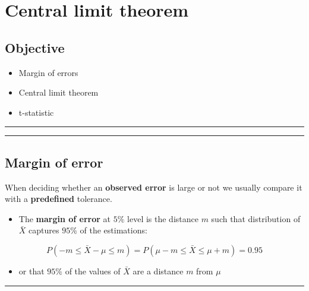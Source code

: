 \documentclass[
]{book}
\providecommand{\tightlist}{%
  \setlength{\itemsep}{0pt}\setlength{\parskip}{0pt}}
\begin{document}
\hypertarget{central-limit-theorem}{%
\chapter{Central limit theorem}\label{central-limit-theorem}}

\hypertarget{objective-9}{%
\section{Objective}\label{objective-9}}

\begin{itemize}
\tightlist
\item
  Margin of errors
\item
  Central limit theorem
\item
  t-statistic
\end{itemize}

\begin{center}\rule{0.5\linewidth}{0.5pt}\end{center}

\begin{center}\rule{0.5\linewidth}{0.5pt}\end{center}

\hypertarget{margin-of-error}{%
\section{Margin of error}\label{margin-of-error}}

When deciding whether an \textbf{observed error} is large or not we usually compare it with a \textbf{predefined} tolerance.

\begin{itemize}
\tightlist
\item
  The \textbf{margin of error} at \(5\%\) level is the distance \(m\) such that distribution of \(\bar{X}\) captures \(95\%\) of the estimations:
\end{itemize}

\[P(-m \leq \bar{X}-\mu \leq m)=P(\mu-m \leq \bar{X} \leq\mu + m)=0.95\]

\begin{itemize}
\tightlist
\item
  or that \(95\%\) of the values of \(\bar{X}\) are a distance \(m\) from \(\mu\)
\end{itemize}

\begin{center}\rule{0.5\linewidth}{0.5pt}\end{center}
\end{document}
